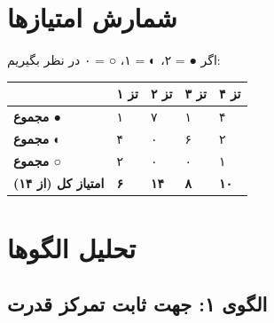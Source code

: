 \section{شمارش امتیازها}

\begin{principleBox}
اگر ● = ۲، ◐ = ۱، ○ = ۰ در نظر بگیریم:

\begin{longtable}{%
    >{\centering\arraybackslash}p{}
    >{\centering\arraybackslash}p{}
    >{\centering\arraybackslash}p{}
    >{\centering\arraybackslash}p{}
    >{\centering\arraybackslash}p{}}
\toprule
\rowcolor{cPrimary!10}
& \cellcolor{cGreen!15}\textbf{تز ۱} & \cellcolor{cAccent!10}\textbf{تز ۲} & \cellcolor{cGold!15}\textbf{تز ۳} & \cellcolor{cConsolid!10}\textbf{تز ۴} \\
\midrule

\textbf{مجموع ●} & ۱ & ۷ & ۱ & ۴ \\
\textbf{مجموع ◐} & ۴ & ۰ & ۶ & ۲ \\
\textbf{مجموع ○} & ۲ & ۰ & ۰ & ۱ \\
\midrule
\textbf{امتیاز کل (از ۱۴)} &
\cellcolor{cGreen!15}\textbf{۶} &
\cellcolor{cAccent!10}\textbf{۱۴} &
\cellcolor{cGold!15}\textbf{۸} &
\cellcolor{cConsolid!10}\textbf{۱۰} \\

\bottomrule
\end{longtable}
\end{principleBox}

\section{تحلیل الگوها}

\subsection{الگوی ۱: جهت ثابت تمرکز قدرت}

